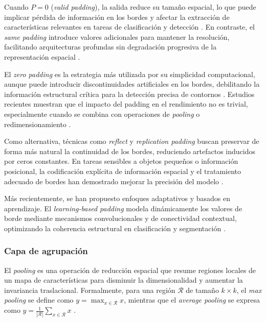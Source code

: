 Cuando $P=0$ (\textit{valid padding}), la salida reduce su tamaño espacial, lo que puede implicar pérdida de información en los bordes y afectar la extracción de características relevantes en tareas de clasificación y detección \parencite{Zou2021,Shahnaz2023}. En contraste, el \textit{same padding} introduce valores adicionales para mantener la resolución, facilitando arquitecturas profundas sin degradación progresiva de la representación espacial \parencite{Shahnaz2023}.

El \textit{zero padding} es la estrategia más utilizada por su simplicidad computacional, aunque puede introducir discontinuidades artificiales en los bordes, debilitando la información estructural crítica para la detección precisa de contornos \parencite{Zou2021,Yu2023}. Estudios recientes muestran que el impacto del padding en el rendimiento no es trivial, especialmente cuando se combina con operaciones de \textit{pooling} o redimensionamiento \parencite{Yu2023,Shahnaz2023}.

Como alternativa, técnicas como \textit{reflect} y \textit{replication padding} buscan preservar de forma más natural la continuidad de los bordes, reduciendo artefactos inducidos por ceros constantes. En tareas sensibles a objetos pequeños o información posicional, la codificación explícita de información espacial y el tratamiento adecuado de bordes han demostrado mejorar la precisión del modelo \parencite{Feng2024}.

Más recientemente, se han propuesto enfoques adaptativos y basados en aprendizaje. El \textit{learning-based padding} modela dinámicamente los valores de borde mediante mecanismos convolucionales y de conectividad contextual, optimizando la coherencia estructural en clasificación y segmentación \parencite{Ning2023}. 

\subsubsection{Capa de agrupación}

El \textit{pooling} es una operación de reducción espacial que resume regiones locales de un mapa de características para disminuir la dimensionalidad y aumentar la invariancia traslacional. Formalmente, para una región $\mathcal{R}$ de tamaño $k \times k$, el \textit{max pooling} se define como $y = \max_{x \in \mathcal{R}} x$, mientras que el \textit{average pooling} se expresa como $y = \frac{1}{|\mathcal{R}|}\sum_{x \in \mathcal{R}} x$ \parencite{Nirthika2022,Liawatimena2022}.

